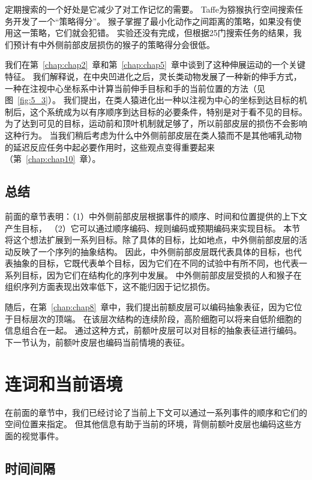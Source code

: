 定期搜索的一个好处是它减少了对工作记忆的需要。
Taffe\cite{taffe2011rhesus}为猕猴执行空间搜索任务开发了一个“策略得分”。
猴子掌握了最小化动作之间距离的策略，如果没有使用这一策略，它们就会犯错。
实验还没有完成，但根据25门搜索任务的结果，我们预计有中外侧前部皮层损伤的猴子的策略得分会很低。


我们在第~\ref{chap:chap2}~章和第~\ref{chap:chap5}~章中谈到了这种伸展运动的一个关键特征。
我们解释说，在中央凹进化之后，灵长类动物发展了一种新的伸手方式，一种在注视中心坐标系中计算当前伸手目标和手的当前位置的方法（见图~\ref{fig:5_3}）。
我们提出，在类人猿进化出一种以注视为中心的坐标到达目标的机制后，这个系统成为以有序顺序到达目标的必要条件，特别是对于看不见的目标。
为了达到可见的目标，运动前和顶叶机制就足够了，所以前部皮层的损伤不会影响这种行为。
当我们稍后考虑为什么中外侧前部皮层在类人猿而不是其他哺乳动物的延迟反应任务中起必要作用时，这些观点变得重要起来（第~\ref{chap:chap10}~章）。



\subsection{总结}

前面的章节表明：（1）中外侧前部皮层根据事件的顺序、时间和位置提供的上下文产生目标，
（2）它可以通过顺序编码、规则编码或预期编码来实现目标。
本节将这个想法扩展到一系列目标。除了具体的目标，比如地点，中外侧前部皮层的活动反映了一个序列的抽象结构。
因此，中外侧前部皮层既代表具体的目标，也代表抽象的目标，它既代表单个目标，因为它们在不同的试验中有所不同，也代表一系列目标，因为它们在结构化的序列中发展。
中外侧前部皮层受损的人和猴子在组织序列方面表现出效率低下，这不能归因于记忆损伤。


随后，在第~\ref{chap:chap8}~章中，我们提出前额皮层可以编码抽象表征，因为它位于目标层次的顶端。
在该层次结构的连续阶段，高阶细胞可以将来自低阶细胞的信息组合在一起。
通过这种方式，前额叶皮层可以对目标的抽象表征进行编码。
下一节认为，前额叶皮层也编码当前情境的表征。



\section{连词和当前语境}

在前面的章节中，我们已经讨论了当前上下文可以通过一系列事件的顺序和它们的空间位置来指定。
但其他信息有助于当前的环境，背侧前额叶皮层也编码这些方面的视觉事件。


\subsection{时间间隔}


